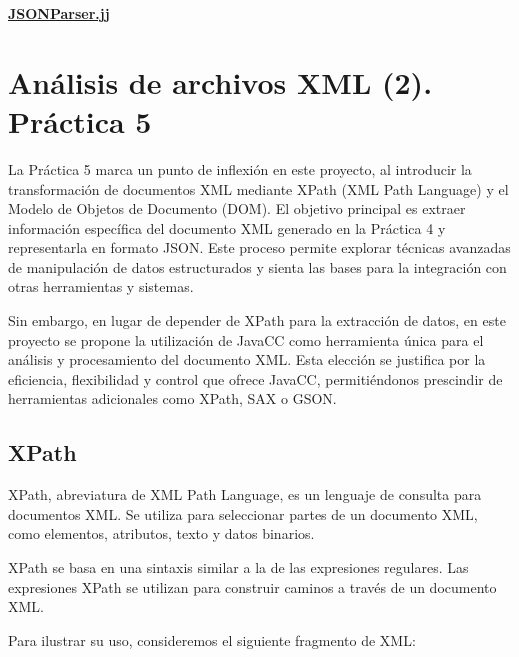 \hyperref[sec:JSONParser]{\textbf{JSONParser.jj}}

\section{Análisis de archivos XML (2). Práctica 5}


\noindent La Práctica 5 marca un punto de inflexión en este proyecto, al introducir la transformación de documentos XML mediante XPath (XML Path Language) y el Modelo de Objetos de Documento (DOM). El objetivo principal es extraer información específica del documento XML generado en la Práctica 4 y representarla en formato JSON. Este proceso permite explorar técnicas avanzadas de manipulación de datos estructurados y sienta las bases para la integración con otras herramientas y sistemas.

Sin embargo, en lugar de depender de XPath para la extracción de datos, en este proyecto se propone la utilización de JavaCC como herramienta única para el análisis y procesamiento del documento XML. Esta elección se justifica por la eficiencia, flexibilidad y control que ofrece JavaCC, permitiéndonos prescindir de herramientas adicionales como XPath, SAX o GSON.

\subsection{XPath}

XPath, abreviatura de XML Path Language, es un lenguaje de consulta para documentos XML. Se utiliza para seleccionar partes de un documento XML, como elementos, atributos, texto y datos binarios.

XPath se basa en una sintaxis similar a la de las expresiones regulares. Las expresiones XPath se utilizan para construir caminos a través de un documento XML.

Para ilustrar su uso, consideremos el siguiente fragmento de XML:

